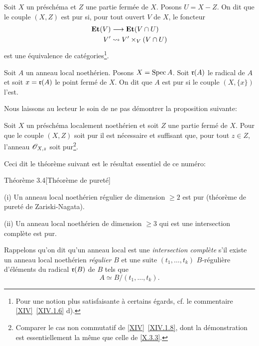 \begin{definition} \label{X.3.1}
Soit $X$ un pr\'esch\'ema et $Z$ une partie ferm\'ee de $X$. Posons $U=X-Z$. On dit que le couple $(X, Z)$ est pur si, pour tout ouvert $V$ de $X$, le foncteur
\[
\begin{aligned} \Et(V) &\to \Et(V\cap U) \\
V' &\rightsquigarrow V'\times_V(V\cap U)
\end{aligned}
\]
est une \'equivalence de cat\'egories\footnote{Pour une notion plus satisfaisante \`a certains \'egards, cf. le commentaire \ref{XIV}~\ref{XIV.1.6} d).}.
\end{definition}

\begin{definition} \label{X.3.2}
Soit $A$ un anneau local noeth\'erien. Posons $X=\operatorname{Spec} A$. Soit $\mathfrak{r}(A)$ le radical de $A$ et soit $x=\mathfrak{r}(A)$ le point ferm\'e de $X$. On dit que $A$ est pur si le couple $(X, \{x\})$ l'est.
\end{definition}

Nous laissons au lecteur le soin de ne pas d\'emontrer la proposition suivante:

\begin{proposition} \label{X.3.3}
Soit $X$ un pr\'esch\'ema localement noeth\'erien et soit $Z$ une partie ferm\'e de $X$. Pour que le couple $(X, Z)$ soit pur il est n\'ecessaire et suffisant que, pour tout $z\in Z$, l'anneau ${\mathscr O}_{X, z}$ soit pur\footnote{Comparer le cas non commutatif de \ref{XIV}~\ref{XIV.1.8}, dont la d\'emonstration est essentiellement la m\^eme que celle de \ref{X.3.3}.}.
\end{proposition}

Ceci dit le th\'eor\`eme suivant est le r\'esultat essentiel de ce num\'ero:

\label{X.3.4}
\begin{enonce*}{Th\'eor\`eme 3.4}[Th\'eor\`eme de puret\'e\ndemark]

\textup{(i)}\enspace
Un anneau local noeth\'erien r\'egulier de dimension $\geq 2$ est pur (th\'eor\`eme de puret\'e de Zariski-Nagata).

\textup{(ii)}\enspace
Un anneau local noeth\'erien de dimension $\geq 3$ qui est une intersection compl\`ete est pur.
\end{enonce*}

Rappelons qu'on dit qu'un anneau local est une \emph{intersection complète} s'il existe un anneau local noeth\'erien \emph{régulier} $B$ et une suite $(t_1, \ldots, t_k)$ $B$-r\'eguli\`ere d'\'el\'ements du radical $\mathfrak{r}(B)$ de $B$ tels que
\[
A \simeq B/(t_1, \ldots, t_k).
\]

